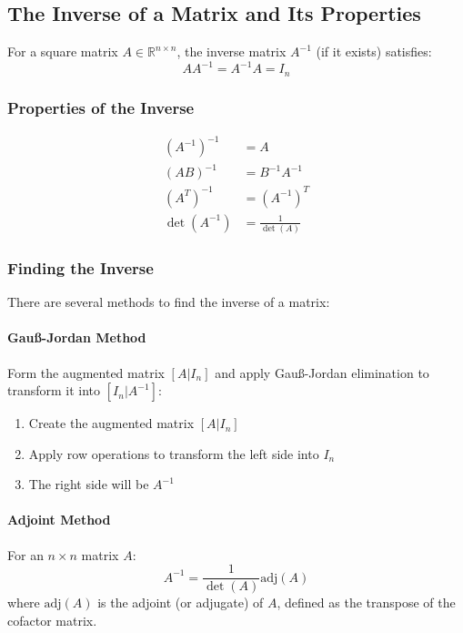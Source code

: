 \subsection{The Inverse of a Matrix and Its Properties}

For a square matrix \(A \in \mathbb{R}^{n \times n}\), the inverse matrix \(A^{-1}\) (if it exists) satisfies:
\begin{equation*}
A A^{-1} = A^{-1} A = I_n
\end{equation*}

\subsubsection{Properties of the Inverse}
\begin{align*}
(A^{-1})^{-1} &= A \\
(AB)^{-1} &= B^{-1}A^{-1} \\
(A^T)^{-1} &= (A^{-1})^T \\
\det(A^{-1}) &= \frac{1}{\det(A)}
\end{align*}

\subsubsection{Finding the Inverse}
There are several methods to find the inverse of a matrix:

\paragraph{Gauß-Jordan Method} 
Form the augmented matrix \([A|I_n]\) and apply Gauß-Jordan elimination to transform it into \([I_n|A^{-1}]\):
\begin{enumerate}
    \item Create the augmented matrix \([A|I_n]\)
    \item Apply row operations to transform the left side into \(I_n\)
    \item The right side will be \(A^{-1}\)
\end{enumerate}

\paragraph{Adjoint Method}
For an \(n \times n\) matrix \(A\):
\begin{equation*}
A^{-1} = \frac{1}{\det(A)} \text{adj}(A)
\end{equation*}
where \(\text{adj}(A)\) is the adjoint (or adjugate) of \(A\), defined as the transpose of the cofactor matrix.

